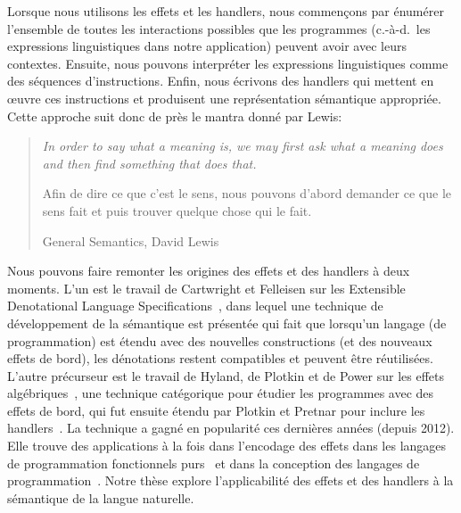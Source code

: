 Lorsque nous utilisons les effets et les handlers, nous commençons par énumérer
l'ensemble de toutes les interactions possibles que les programmes (c.-à-d.\ les
expressions linguistiques dans notre application) peuvent avoir avec leurs
contextes. Ensuite, nous pouvons interpréter les expressions linguistiques comme
des séquences d'instructions. Enfin, nous écrivons des handlers qui
mettent en œuvre ces instructions et produisent une représentation sémantique
appropriée. Cette approche suit donc de près le mantra donné par Lewis:

\begin{quote}
  \begin{english}
    \textit{In order to say what a meaning is, we may first ask what a meaning
      does and then find something that does that.}
  \end{english}

  Afin de dire ce que c'est le sens, nous pouvons d'abord demander ce que le
  sens fait et puis trouver quelque chose qui le fait.

  \begin{flushright}
    General Semantics, David Lewis~\cite{lewis1970general}
  \end{flushright}
\end{quote}

Nous pouvons faire remonter les origines des effets et des handlers à deux moments. L'un
est le travail de Cartwright et Felleisen sur les Extensible Denotational
Language Specifications~\cite{cartwright1994extensible}, dans lequel une
technique de développement de la sémantique est présentée qui fait que lorsqu'un
langage (de programmation) est étendu avec des nouvelles constructions (et des
nouveaux effets de bord), les dénotations restent compatibles et peuvent être
réutilisées. L'autre précurseur est le travail de Hyland, de Plotkin et de Power
sur les effets algébriques~\cite{hyland2006combining}, une technique catégorique
pour étudier les programmes avec des effets de bord, qui fut ensuite étendu par
Plotkin et Pretnar pour inclure les
handlers~\cite{plotkin2009handlers,pretnar2010logic,plotkin2013handling}. La
technique a gagné en popularité ces dernières années (depuis 2012). Elle
trouve des applications à la fois dans l'encodage des effets dans les langages
de programmation fonctionnels
purs~\cite{kiselyov2013extensible,kiselyov2015freer,kammar2013handlers,brady2013programming}
et dans la conception des langages de
programmation~\cite{bauer2012programming,lindley2016dobedobedo,dolan2015effective,kiselyov2016eff,hillerstrom2016compiling}.
Notre thèse explore l'applicabilité des effets et des handlers à la sémantique
de la langue naturelle.

